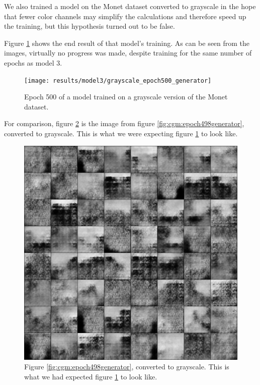 \documentclass[11pt,letterpaper]{article}
\begin{document}
				We also trained a model on the Monet dataset converted to grayscale in the hope that fewer color channels may simplify the calculations and therefore speed up the training, but this hypothesis turned out to be false.

				Figure \ref{fig:cgm:gray:epoch500generator} shows the end result of that model's training.
				As can be seen from the images, virtually no progress was made, despite training for the same number of epochs as model 3.
				\begin{figure}
					\centering
					\texttt{[image: results/model3/grayscale\_epoch500\_generator]}
					\caption{Epoch 500 of a model trained on a grayscale version of the Monet dataset.}
					\label{fig:cgm:gray:epoch500generator}
				\end{figure}

				For comparison, figure \ref{fig:cgm:epoch498grayscale} is the image from figure \ref{fig:cgm:epoch498generator}, converted to grayscale.
				This is what we were expecting figure \ref{fig:cgm:gray:epoch500generator} to look like.
				\begin{figure}
					\centering
					\includegraphics[width=1.0\linewidth]{results/model3/epoch498grayscale}
					\caption{Figure \ref{fig:cgm:epoch498generator}, converted to grayscale. This is what we had expected figure \ref{fig:cgm:gray:epoch500generator} to look like.}
					\label{fig:cgm:epoch498grayscale}
				\end{figure}
\end{document}
